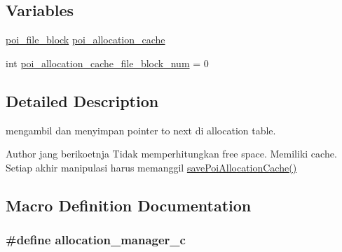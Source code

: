 \subsection*{Variables}
\begin{DoxyCompactItemize}
\item 
\hyperlink{structpoi__file__block}{poi\-\_\-file\-\_\-block} \hyperlink{allocation-block-manager_8c_a8cca9731003c6880e9aa8c3eb9d24951}{poi\-\_\-allocation\-\_\-cache}
\item 
int \hyperlink{allocation-block-manager_8c_a0f8b81672add5e3cee6cadcec0ff91b6}{poi\-\_\-allocation\-\_\-cache\-\_\-file\-\_\-block\-\_\-num} = 0
\end{DoxyCompactItemize}


\subsection{Detailed Description}
mengambil dan menyimpan pointer to next di allocation table. \begin{DoxyAuthor}{Author}
jang berikoetnja Tidak memperhitungkan free space. Memiliki cache. Setiap akhir manipulasi harus memanggil \hyperlink{allocation-block-manager_8c_aa62c7923af0be489b52b1dcdd7c04e23}{save\-Poi\-Allocation\-Cache()} 
\end{DoxyAuthor}


\subsection{Macro Definition Documentation}
\hypertarget{allocation-block-manager_8c_a7c27d1e5590b712625952d2abcef87f2}{
\subsubsection[{allocation\-\_\-manager\-\_\-c}]{\setlength{\rightskip}{0pt plus 5cm}\#define allocation\-\_\-manager\-\_\-c}}\label{allocation-block-manager_8c_a7c27d1e5590b712625952d2abcef87f2}


